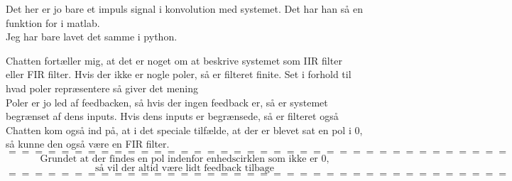 \begin{Opgaver}
\begin{kapitel}[Z transformation]
\begin{Opgave}
            \begin{UnderOpgave}
                Det her er jo bare et impuls signal i konvolution med systemet. Det har han så en funktion for i matlab.\\
                Jeg har bare lavet det samme i python. 
            \end{UnderOpgave}

            \begin{UnderOpgave}
                Chatten fortæller mig, at det er noget om at beskrive systemet som IIR filter eller FIR filter. 
                Hvis der ikke er nogle poler, så er filteret finite. Set i forhold til hvad poler repræsentere så giver det mening \\
                Poler er jo led af feedbacken, så hvis der ingen feedback er, så er systemet begrænset af dens inputs. Hvis dens inputs er begrænsede, så er filteret også \\
                Chatten kom også ind på, at i det speciale tilfælde, at der er blevet sat en pol i 0, så kunne den også være en FIR filter.
                \[======================================\]
                \[\text{Grundet at der findes en pol indenfor enhedscirklen som ikke er 0,}\]
                \[\text{så vil der altid være lidt feedback tilbage}\]
                \[======================================\]
            \end{UnderOpgave}


\end{Opgave}
\end{kapitel}
\end{Opgaver}
